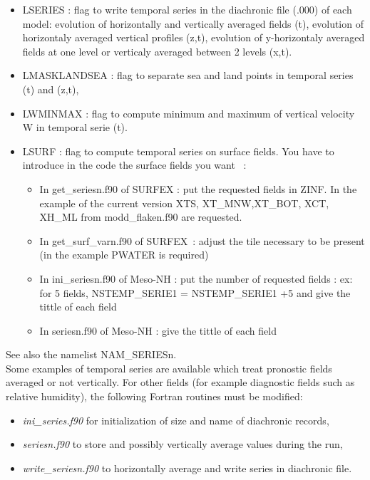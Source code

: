\begin{itemize}
\item LSERIES :
 flag to write temporal series in the diachronic file (.000) of each model:
evolution of horizontally and vertically averaged fields (t), 
evolution of horizontaly averaged vertical profiles (z,t), 
evolution of y-horizontaly averaged fields at one level or verticaly averaged between 2 levels (x,t). 
\item LMASKLANDSEA :
 flag to separate sea and land points in temporal series (t) and (z,t),
\item LWMINMAX :
 flag to compute minimum and maximum of vertical velocity W in temporal serie
(t).
\item LSURF : flag to compute temporal series on surface fields.
You have to introduce in the code the surface fields you want  : 
\begin{itemize}
\item In  get\_seriesn.f90 of SURFEX : put the requested fields in ZINF. In the example of the current version XTS, XT\_MNW,XT\_BOT, XCT, XH\_ML from modd\_flaken.f90 are requested.
\item In get\_surf\_varn.f90 of SURFEX : adjust the tile necessary to be present (in the example PWATER is required)
\item In ini\_seriesn.f90 of Meso-NH : put the number of requested fields  : ex: for 5 fields, NSTEMP\_SERIE1 = NSTEMP\_SERIE1 +5 and give the tittle of each field
\item In seriesn.f90 of Meso-NH : give the tittle of each field
\end{itemize}
\end{itemize}
See also the namelist NAM\_SERIESn. \\

Some examples of temporal series are available which treat pronostic fields 
averaged or not vertically. For other fields (for example diagnostic
fields such as relative humidity), the following Fortran
routines must be modified:
\begin{itemize}
\item  {\it ini\_series.f90} for initialization of size and name of diachronic
records,
\item  {\it seriesn.f90} to store and possibly vertically average values 
during the run,
\item  {\it write\_seriesn.f90} to horizontally average and write series in
diachronic file.
\end{itemize}
